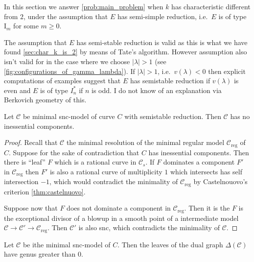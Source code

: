 In this section we answer \cref{prob:main_problem} when $k$ has characteristic different from $2$, under the assumption that $E$ has semi-simple reduction, i.e.\  $E$ is of type $\mathrm I_m$ for some $m \ge 0$. 

\begin{remark}\label{rem:justification_semistable}
	The assumption that $E$ has semi-stable reduction is valid as this is what we have found \cref{sec:char_k_is_2} by means of Tate's algorithm. 
	However assumption also isn't valid for in the case where we choose $|\lambda| > 1$ (see \cref{fig:configurations_of_gamma_lambda}).
	If $|\lambda| > 1$, i.e.\ $v(\lambda) < 0$ then
	explicit computations of examples suggest that  $E$ has semistable reduction if $v(\lambda)$ is even and $E$ is of type $I^*_n$ if $n$ is odd. 
	I do not know of an explanation via Berkovich geometry of this. 
\end{remark}

\begin{lemma}\label{lem:semistable_skeleton}
	Let $\mathscr C$ be minimal snc-model of curve $C$ with semistable reduction.
	Then $\mathscr C$ has no inessential components. 
\end{lemma}
\begin{proof}
	Recall that $\mathscr C$ the minimal resolution of the minimal regular model $\mathscr C_\text{reg} $ of $C$. 
	Suppose for the sake of contradiction that  $C$ has inessential components.
	Then there is ``leaf''  $F$ which is a rational curve in $\mathscr C_s$. 
	If $F$ dominates a component $F'$ in $\mathscr C_\text{reg} $ then $F'$ is also a rational curve of multiplicity $1$ which intersects has self intersection $-1$,  which would contradict the minimality of  $\mathscr C _\text{reg} $ by Castelnouovo's criterion \cref{thm:castelnuovo}. 

	Suppose now that $F$ does not dominate a component in $\mathscr C_\text{reg} $.
	Then it is the $F$ is the exceptional divisor of a blowup in a smooth point of a intermediate model $\mathscr C \to \mathscr C' \to \mathscr C_\text{reg} $. 
	Then $\mathscr C'$ is also snc, which contradicts the minimality of $\mathscr C$. 
\end{proof}
\begin{corollary}
	Let $\mathscr C$ be ithe minimal snc-model of $C$. 
	Then the leaves of the dual graph  $\Delta (\mathscr C)$ have genus greater than $0$. 
\end{corollary}

